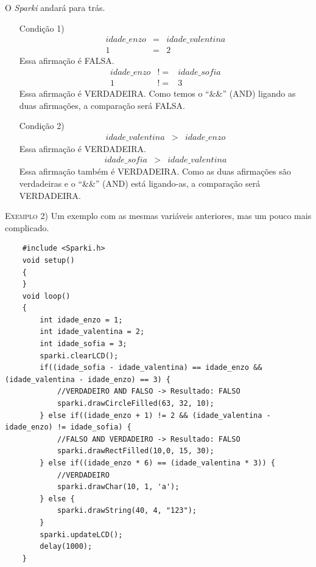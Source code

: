     O \textsl{Sparki} andará para trás.
    \begin{itemize}
        \item[Condição 1)]
        \begin{eqnarray}
        idade\_enzo & = & idade\_valentina\\
        1 & = & 2 \nonumber     \end{eqnarray}
        Essa afirmação é FALSA.
        \begin{eqnarray}
        idade\_enzo & != & idade\_sofia\\
        1 & != & 3 \nonumber
        \end{eqnarray}
        Essa afirmação é VERDADEIRA.
        Como temos o ``\&\&'' (AND) ligando as duas afirmações, a comparação será FALSA.
        \item[Condição 2)]
        \begin{eqnarray}
        idade\_valentina & > & idade\_enzo
        \end{eqnarray}
        Essa afirmação é VERDADEIRA.
        \begin{eqnarray}
        idade\_sofia & > & idade\_valentina
        \end{eqnarray}
        Essa afirmação também é VERDADEIRA. Como as duas afirmações são verdadeiras e o ``\&\&'' (AND) está ligando-as, a comparação será VERDADEIRA.
    \end{itemize} 
    
    \textsc{Exemplo 2)} Um exemplo com as mesmas variáveis anteriores, mas um pouco mais complicado.
    
    \begin{verbatim}
    #include <Sparki.h>
    void setup()
    {
    }
    void loop()
    {
        int idade_enzo = 1;
        int idade_valentina = 2;
        int idade_sofia = 3;
        sparki.clearLCD();
        if((idade_sofia - idade_valentina) == idade_enzo && (idade_valentina - idade_enzo) == 3) {
            //VERDADEIRO AND FALSO -> Resultado: FALSO
            sparki.drawCircleFilled(63, 32, 10);
        } else if((idade_enzo + 1) != 2 && (idade_valentina - idade_enzo) != idade_sofia) {
            //FALSO AND VERDADEIRO -> Resultado: FALSO
            sparki.drawRectFilled(10,0, 15, 30);
        } else if((idade_enzo * 6) == (idade_valentina * 3)) {
            //VERDADEIRO
            sparki.drawChar(10, 1, 'a');
        } else {
            sparki.drawString(40, 4, "123");
        } 
        sparki.updateLCD();
        delay(1000);
    }
    \end{verbatim}
    
